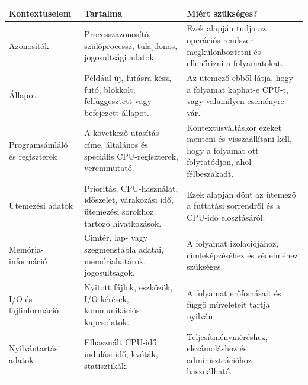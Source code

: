 \begin{tabularx}{\textwidth}{L{36mm}X X}
\toprule
\textbf{Kontextuselem} & \textbf{Tartalma} & \textbf{Miért szükséges?} \\
\midrule
Azonosítók & Processzazonosító, szülőprocessz, tulajdonos, jogosultsági adatok. & Ezek alapján tudja az operációs rendszer megkülönböztetni és ellenőrizni a folyamatokat. \\
Állapot & Például új, futásra kész, futó, blokkolt, felfüggesztett vagy befejezett állapot. & Az ütemező ebből látja, hogy a folyamat kaphat-e CPU-t, vagy valamilyen eseményre vár. \\
Programsámláló és regiszterek & A következő utasítás címe, általános és speciális CPU-regiszterek, veremmutató. & Kontextusváltáskor ezeket menteni és visszaállítani kell, hogy a folyamat ott folytatódjon, ahol félbeszakadt. \\
Ütemezési adatok & Prioritás, CPU-használat, időszelet, várakozási idő, ütemezési sorokhoz tartozó hivatkozások. & Ezek alapján dönt az ütemező a futtatási sorrendről és a CPU-idő elosztásáról. \\
Memória-információ & Címtér, lap- vagy szegmenstábla adatai, memóriahatárok, jogosultságok. & A folyamat izolációjához, címleképzéséhez és védelméhez szükséges. \\
I/O és fájlinformáció & Nyitott fájlok, eszközök, I/O kérések, kommunikációs kapcsolatok. & A folyamat erőforrásait és függő műveleteit tartja nyilván. \\
Nyilvántartási adatok & Elhasznált CPU-idő, indulási idő, kvóták, statisztikák. & Teljesítményméréshez, elszámoláshoz és adminisztrációhoz használható. \\
\bottomrule
\end{tabularx}
